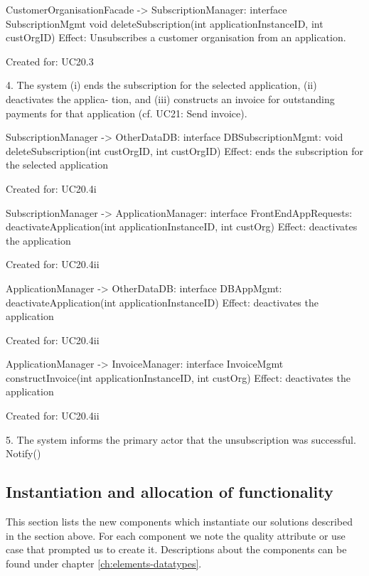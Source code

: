 {{{{{{{{             CustomerOrganisationFacade -> SubscriptionManager: interface SubscriptionMgmt
                                              void  deleteSubscription(int applicationInstanceID, int custOrgID)
             Effect: Unsubscribes a customer organisation from an application.
             \item Created for: UC20.3

        4. The system (i) ends the subscription for the selected application, (ii) deactivates the applica-
            tion, and (iii) constructs an invoice for outstanding payments for that application (cf. UC21:
            Send invoice).

            SubscriptionManager -> OtherDataDB: interface DBSubscriptionMgmt:
                                             void deleteSubscription(int custOrgID, int custOrgID)
                Effect: ends the subscription for the selected application
                \item Created for: UC20.4i

            SubscriptionManager -> ApplicationManager: interface FrontEndAppRequests:
                                    deactivateApplication(int applicationInstanceID, int custOrg)
                Effect: deactivates the application
                \item Created for: UC20.4ii

            ApplicationManager -> OtherDataDB: interface DBAppMgmt:
                                    deactivateApplication(int applicationInstanceID)
                Effect: deactivates the application
                \item Created for: UC20.4ii


            ApplicationManager  -> InvoiceManager: interface InvoiceMgmt
                                   constructInvoice(int applicationInstanceID, int custOrg)
                Effect: deactivates the application
                \item Created for: UC20.4ii


        5. The system informs the primary actor that the unsubscription was successful.
            Notify()

\subsection{Instantiation and allocation of functionality}
    This section lists the new components which instantiate our solutions
    described in the section above. For each component we note the quality
    attribute or use case that prompted us to create it. Descriptions about
    the components can be found under chapter \ref{ch:elements-datatypes}. \\

}}}}}}}}
